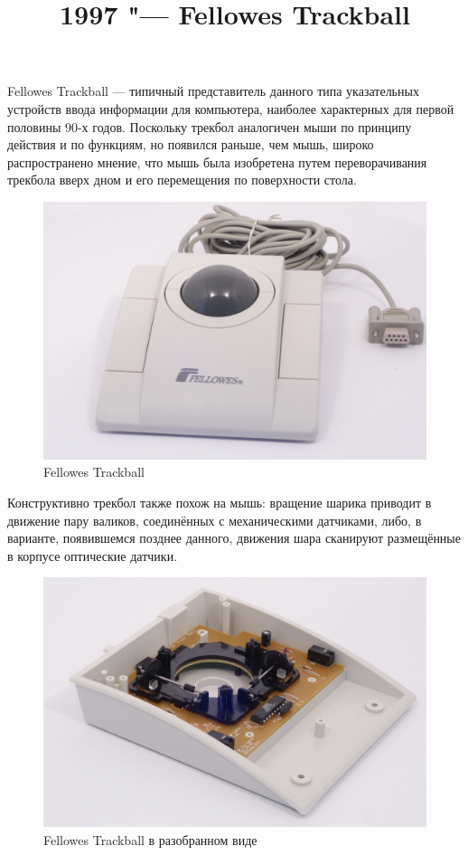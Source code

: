 \documentclass[11pt, a4paper]{article}
\begin{document}
\title{1997 "--- Fellowes Trackball}
\date{}
\maketitle
Fellowes Trackball — типичный представитель данного типа указательных устройств ввода информации для компьютера, наиболее характерных для первой половины 90-х годов. Поскольку трекбол аналогичен мыши по принципу действия и по функциям, но появился раньше, чем мышь, широко распространено мнение, что мышь была изобретена путем переворачивания трекбола вверх дном и его перемещения по поверхности стола.

\begin{figure}[h]
    \centering
    \includegraphics[scale=0.2]{1997_fellowes_trackball/fellowes.jpg}
    \caption{Fellowes Trackball}
    \label{fig:pic}
\end{figure}

Конструктивно трекбол также похож на мышь: вращение шарика приводит в движение пару валиков, соединённых с механическими датчиками, либо, в варианте, появившемся позднее данного, движения шара сканируют размещённые в корпусе оптические датчики. 

\begin{figure}[h]
    \centering
    \includegraphics[scale=0.3]{1997_fellowes_trackball/fellowes2.jpg}
    \caption{Fellowes Trackball в разобранном виде}
    \label{fig:inside}
\end{figure}
\end{document}
